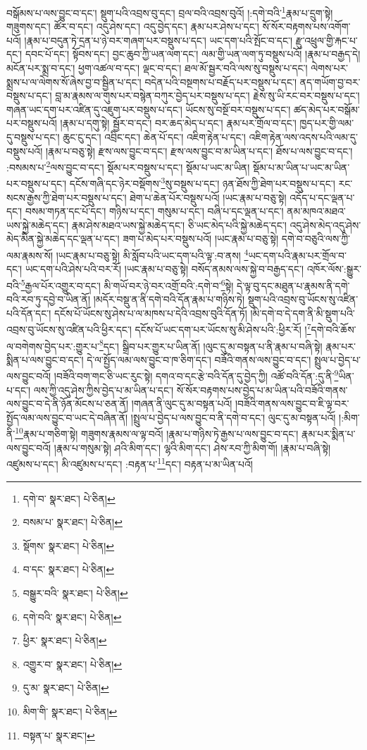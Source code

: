 བསྒོམས་པ་ལས་བྱུང་བ་དང་། སྡུག་པའི་འབྲས་བུ་དང་། བྲལ་བའི་འབྲས་བུའོ། །:དགེ་བའི་\footnote{དགེ་བ་  སྣར་ཐང་།  པེ་ཅིན། }རྣམ་པ་དྲུག་སྟེ། གཟུགས་དང་། ཚོར་བ་དང་། འདུ་ཤེས་དང་། འདུ་བྱེད་དང་། རྣམ་པར་ཤེས་པ་དང་། སོ་སོར་བརྟགས་པས་འགོག་པའོ། །རྣམ་པ་བདུན་ཏེ་དྲན་པ་ཉེ་བར་གཞག་པར་བསྡུས་པ་དང་། ཡང་དག་པའི་སྤོང་བ་དང་། རྫུ་འཕྲུལ་གྱི་རྐང་པ་དང་། དབང་པོ་དང་། སྟོབས་དང་། བྱང་ཆུབ་ཀྱི་ཡན་ལག་དང་། ལམ་གྱི་ཡན་ལག་ཏུ་བསྡུས་པའོ། །རྣམ་པ་བརྒྱད་དེ། མངོན་པར་སྨྲ་བ་དང་། ཕྱག་འཚལ་བ་དང་། ལྡང་བ་དང་། ཐལ་མོ་སྦྱར་བའི་ལས་སུ་བསྡུས་པ་དང་། ལེགས་པར་སྨྲས་པ་ལ་ལེགས་སོ་ཞེས་བྱ་བ་སྦྱིན་པ་དང་། བདེན་པའི་བསྔགས་པ་བརྗོད་པར་བསྡུས་པ་དང་། ནད་གཡོག་བྱ་བར་བསྡུས་པ་དང་། བླ་མ་རྣམས་ལ་གུས་པར་བསྙེན་བཀུར་བྱེད་པར་བསྡུས་པ་དང་། རྗེས་སུ་ཡི་རང་བར་བསྡུས་པ་དང་། གཞན་ཡང་དག་པར་འཛིན་དུ་འཇུག་པར་བསྡུས་པ་དང་། ཡོངས་སུ་བསྔོ་བར་བསྡུས་པ་དང་། ཚད་མེད་པར་བསྒོམ་པར་བསྡུས་པའོ། །རྣམ་པ་དགུ་སྟེ། སྦྱོར་བ་དང་། བར་ཆད་མེད་པ་དང་། རྣམ་པར་གྲོལ་བ་དང་། ཁྱད་པར་གྱི་ལམ་དུ་བསྡུས་པ་དང་། ཆུང་ངུ་དང་། འབྲིང་དང་། ཆེན་པོ་དང་། འཇིག་རྟེན་པ་དང་། འཇིག་རྟེན་ལས་འདས་པའི་ལམ་དུ་བསྡུས་པའོ། །རྣམ་པ་བཅུ་སྟེ། རྫས་ལས་བྱུང་བ་དང་། རྫས་ལས་བྱུང་བ་མ་ཡིན་པ་དང་། ཐོས་པ་ལས་བྱུང་བ་དང་། :བསམས་པ་\footnote{བསམ་པ་  སྣར་ཐང་།  པེ་ཅིན། }ལས་བྱུང་བ་དང་། སྡོམ་པར་བསྡུས་པ་དང་། སྡོམ་པ་ཡང་མ་ཡིན། སྡོམ་པ་མ་ཡིན་པ་ཡང་མ་ཡིན་པར་བསྡུས་པ་དང་། དངོས་གཞི་དང་ཉེར་བསྡོགས་\footnote{སྡོགས་  སྣར་ཐང་།  པེ་ཅིན། }སུ་བསྡུས་པ་དང་། ཉན་ཐོས་ཀྱི་ཐེག་པར་བསྡུས་པ་དང་། རང་སངས་རྒྱས་ཀྱི་ཐེག་པར་བསྡུས་པ་དང་། ཐེག་པ་ཆེན་པོར་བསྡུས་པའོ། །ཡང་རྣམ་པ་བཅུ་སྟེ། འདོད་པ་དང་ལྡན་པ་དང་། བསམ་གཏན་དང་པོ་དང་། གཉིས་པ་དང་། གསུམ་པ་དང་། བཞི་པ་དང་ལྡན་པ་དང་། ནམ་མཁའ་མཐའ་ཡས་སྐྱེ་མཆེད་དང་། རྣམ་ཤེས་མཐའ་ཡས་སྐྱེ་མཆེད་དང་། ཅི་ཡང་མེད་པའི་སྐྱེ་མཆེད་དང་། འདུ་ཤེས་མེད་འདུ་ཤེས་མེད་མིན་སྐྱེ་མཆེད་དང་ལྡན་པ་དང་། ཟག་པ་མེད་པར་བསྡུས་པའོ། །ཡང་རྣམ་པ་བཅུ་སྟེ། དགེ་བ་བཅུའི་ལས་ཀྱི་ལམ་རྣམས་སོ། །ཡང་རྣམ་པ་བཅུ་སྟེ། མི་སློབ་པའི་ཡང་དག་པའི་ལྟ་:བ་ནས། \footnote{བ་དང་  སྣར་ཐང་།  པེ་ཅིན། }ཡང་དག་པའི་རྣམ་པར་གྲོལ་བ་དང་། ཡང་དག་པའི་ཤེས་པའི་བར་རོ། །ཡང་རྣམ་པ་བཅུ་སྟེ། བསོད་ནམས་ལས་སྐྱེ་བ་བརྒྱད་དང་། འཁོར་ལོས་:སྒྱུར་བའི་\footnote{བསྒྱུར་བའི་  སྣར་ཐང་།  པེ་ཅིན། }རྒྱལ་པོར་འགྱུར་བ་དང་། མི་གཡོ་བར་ཉེ་བར་འགྲོ་བའི་:དགེ་བ་\footnote{དགེ་བའི་  སྣར་ཐང་།  པེ་ཅིན། }སྟེ། དེ་ལྟ་བུ་དང་མཐུན་པ་རྣམས་ནི་དགེ་བའི་རབ་ཏུ་དབྱེ་བ་ཡིན་ནོ། །མདོར་བསྡུ་ན་ནི་དགེ་བའི་དོན་རྣམ་པ་གཉིས་ཏེ། སྡུག་པའི་འབྲས་བུ་ཡོངས་སུ་འཛིན་པའི་དོན་དང་། དངོས་པོ་ཡོངས་སུ་ཤེས་པ་ལ་མཁས་པ་དེའི་འབྲས་བུའི་དོན་ཏོ། །མི་དགེ་བ་དེ་དག་ནི་མི་སྡུག་པའི་འབྲས་བུ་ཡོངས་སུ་འཛིན་པའི་ཕྱིར་དང་། དངོས་པོ་ཡང་དག་པར་ཡོངས་སུ་མི་ཤེས་པའི་:ཕྱིར་རོ། །\footnote{ཕྱིར་  སྣར་ཐང་།  པེ་ཅིན། }དགེ་བའི་ཆོས་ལ་བགེགས་བྱེད་པར་:གྱུར་པ་\footnote{འགྱུར་བ་  སྣར་ཐང་།  པེ་ཅིན། }དང་། སྒྲིབ་པར་གྱུར་པ་ཡིན་ནོ། །ལུང་དུ་མ་བསྟན་པ་ནི་རྣམ་པ་བཞི་སྟེ། རྣམ་པར་སྨིན་པ་ལས་བྱུང་བ་དང་། དེ་ལ་སྤྱོད་ལམ་ལས་བྱུང་བ་ཁ་ཅིག་དང་། བཟོའི་གནས་ལས་བྱུང་བ་དང་། སྤྲུལ་པ་བྱེད་པ་ལས་བྱུང་བའོ། །བཟོའི་བག་གང་ཅི་ཡང་རུང་སྟེ། དགའ་བ་དང་རྩེ་བའི་དོན་དུ་བྱེད་ཀྱི། འཚོ་བའི་དོན་:དུ་ནི་\footnote{དུ་མ་  སྣར་ཐང་།  པེ་ཅིན། }ཡིན་པ་དང་། ལས་ཀྱི་འདུ་ཤེས་ཀྱིས་བྱེད་པ་མ་ཡིན་པ་དང་། སོ་སོར་བརྟགས་པས་བྱེད་པ་མ་ཡིན་པའི་བཟོའི་གནས་ལས་བྱུང་བ་དེ་ནི་ཉོན་མོངས་པ་ཅན་ནོ། །གཞན་ནི་ལུང་དུ་མ་བསྟན་པའོ། །བཟོའི་གནས་ལས་བྱུང་བ་ཇི་ལྟ་བར་སྤྱོད་ལམ་ལས་བྱུང་བ་ཡང་དེ་བཞིན་ནོ། །སྤྲུལ་པ་བྱེད་པ་ལས་བྱུང་བ་ནི་དགེ་བ་དང་། ལུང་དུ་མ་བསྟན་པའོ། །:མིག་ནི་\footnote{མིག་གི་  སྣར་ཐང་།  པེ་ཅིན། }རྣམ་པ་གཅིག་སྟེ། གཟུགས་རྣམས་ལ་ལྟ་བའོ། །རྣམ་པ་གཉིས་ཏེ་རྒྱས་པ་ལས་བྱུང་བ་དང་། རྣམ་པར་སྨིན་པ་ལས་བྱུང་བའོ། །རྣམ་པ་གསུམ་སྟེ། ཤའི་མིག་དང་། ལྷའི་མིག་དང་། ཤེས་རབ་ཀྱི་མིག་གོ། །རྣམ་པ་བཞི་སྟེ། འཛུམས་པ་དང་། མི་འཛུམས་པ་དང་། :བརྟན་པ་\footnote{བསྟན་པ་  སྣར་ཐང་། }དང་། བརྟན་པ་མ་ཡིན་པའོ། 